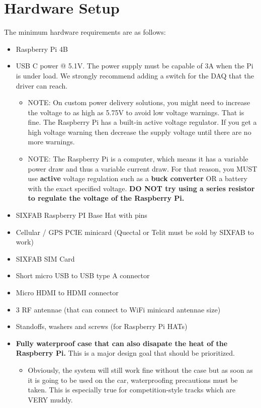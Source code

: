 \documentclass[12pt, letterpaper]{article}
\begin{document}
\section {Hardware Setup}

\par The minimum hardware requirements are as follows: 

\begin{itemize}
	\item Raspberry Pi 4B
	\item USB C power @ 5.1V. The power supply must be capable of 3A when the Pi is under load. We strongly recommend adding a switch for the DAQ that the driver can reach.
	\begin{itemize}
		\item NOTE: On custom power delivery solutions, you might need to increase the voltage to as high as 5.75V to avoid low voltage warnings. That is fine. The Raspberry Pi has a built-in active voltage regulator. If you get a high voltage warning then decrease the supply voltage until there are no more warnings.
		\item NOTE: The Raspberry Pi is a computer, which means it has a variable power draw and thus a variable current draw. For that reason, you MUST use \textbf{active} voltage regulation such as a \textbf{buck converter} OR a battery with the exact specified voltage. \textbf{DO NOT try using a series resistor to regulate the voltage of the Raspberry Pi.}
	\end{itemize}
	\item SIXFAB Raspberry PI Base Hat with pins
	\item Cellular / GPS PCIE minicard (Quectal or Telit must be sold by SIXFAB to work) 
	\item SIXFAB SIM Card
	\item Short micro USB to USB type A connector
	\item Micro HDMI to HDMI connector
	\item 3 RF antennae (that can connect to WiFi minicard antennae size)
	\item Standoffs, washers and screws (for Raspberry Pi HATs)
	\item \textbf{Fully waterproof case that can also disapate the heat of the Raspberry Pi.} This is a major design goal that should be prioritized.
	\begin{itemize}
		\item Obviously, the system will still work fine without the case but as soon as it is going to be used on the car, waterproofing precautions must be taken. This is especially true for competition-style tracks which are VERY muddy.
	\end{itemize}
	
\end{itemize}
 
\end{document}

